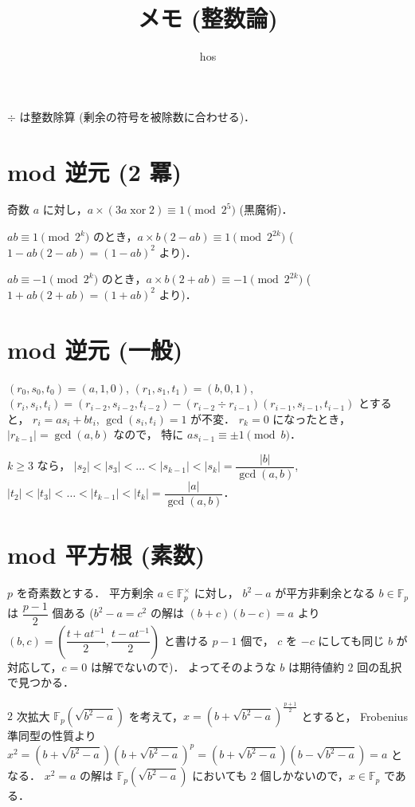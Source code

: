 \documentclass{jsarticle}
\title{メモ (整数論)}
\author{hos}
\DeclareMathOperator{\xor}{xor}
\newcommand{\F}{\mathbb{F}}
\begin{document}
\maketitle

$\div$ は整数除算 (剰余の符号を被除数に合わせる)．


\section{mod 逆元 (2 冪)}
奇数 $a$ に対し，$a \times (3a \xor 2) \equiv 1 \pmod{2^5}$ (黒魔術)．

$a b \equiv 1 \pmod{2^k}$ のとき，$a \times b (2 - a b) \equiv 1 \pmod{2^{2k}}$ ($1 - a b (2 - a b) = (1 - a b)^2$ より)．

$a b \equiv -1 \pmod{2^k}$ のとき，$a \times b (2 + a b) \equiv -1 \pmod{2^{2k}}$ ($1 + a b (2 + a b) = (1 + a b)^2$ より)．


\section{mod 逆元 (一般)}
$(r_0, s_0, t_0) = (a, 1, 0)$, 
$(r_1, s_1, t_1) = (b, 0, 1)$, 
$(r_i, s_i, t_i) = (r_{i-2}, s_{i-2}, t_{i-2}) - (r_{i-2} \div r_{i-1}) (r_{i-1}, s_{i-1}, t_{i-1})$ とすると，
$r_i = a s_i + b t_i$, $\gcd(s_i, t_i) = 1$ が不変．
$r_k = 0$ になったとき，$\lvert r_{k-1} \rvert = \gcd(a, b)$ なので，
特に $a s_{i-1} \equiv \pm 1 \pmod{b}$．

$k \ge 3$ なら，
$|s_2| < |s_3| < \dots < |s_{k-1}| < |s_k| = \dfrac{\lvert b \rvert}{\gcd(a, b)}$, 
$|t_2| < |t_3| < \dots < |t_{k-1}| < |t_k| = \dfrac{\lvert a \rvert}{\gcd(a, b)}$．


\section{mod 平方根 (素数)}
$p$ を奇素数とする．
平方剰余 $a \in \F_p^\times$ に対し，
$b^2 - a$ が平方非剰余となる $b \in \F_p$ は $\dfrac{p - 1}{2}$ 個ある ($b^2 - a = c^2$ の解は
$(b + c) (b - c) = a$ より $(b, c) = \left(\dfrac{t + a t^{-1}}{2}, \dfrac{t - a t^{-1}}{2}\right)$ と書ける $p - 1$ 個で，
$c$ を $-c$ にしても同じ $b$ が対応して，$c = 0$ は解でないので)．
よってそのような $b$ は期待値約 $2$ 回の乱択で見つかる．

$2$ 次拡大 $\F_p(\sqrt{b^2 - a})$ を考えて，$x = \left(b + \sqrt{b^2 - a}\right)^{\frac{p+1}{2}}$ とすると，
Frobenius 準同型の性質より $x^2 = \left(b + \sqrt{b^2 - a}\right) \left(b + \sqrt{b^2 - a}\right)^p = \left(b + \sqrt{b^2 - a}\right) \left(b - \sqrt{b^2 - a}\right) = a$ となる．
$x^2 = a$ の解は $\F_p(\sqrt{b^2 - a})$ においても $2$ 個しかないので，$x \in \F_p$ である．
\end{document}
